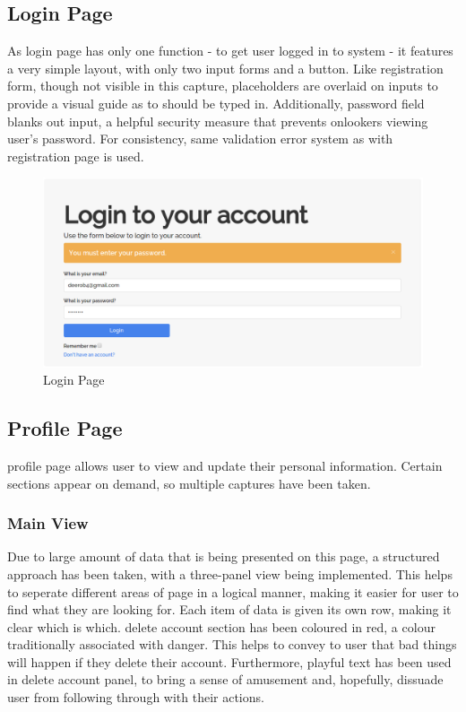 \documentclass{article}[12pt,a4paper]
\begin{document}
\subsection{Login Page}
As login page has only one function - to get user logged in to system - it features a very simple layout, with only two input forms and a button. Like registration form, though not visible in this capture, placeholders are overlaid on inputs to provide a visual guide as to should be typed in. Additionally, password field blanks out input, a helpful security measure that prevents onlookers viewing user's password. For consistency, same validation error system as with registration page is used.

\begin{figure}[h!]
  \includegraphics[scale=0.35]{final_ui/login}
  \caption{Login Page}
\end{figure}
\clearpage

\subsection{Profile Page}
profile page allows user to view and update their personal information. Certain sections appear on demand, so multiple captures have been taken.

\subsubsection{Main View}
Due to large amount of data that is being presented on this page, a structured approach has been taken, with a three-panel view being implemented. This helps to seperate different areas of page in a logical manner, making it easier for user to find what they are looking for. Each item of data is given its own row, making it clear which is which. delete account section has been coloured in red, a colour traditionally associated with danger. This helps to convey to user that bad things will happen if they delete their account. Furthermore, playful text has been used in delete account panel, to bring a sense of amusement and, hopefully, dissuade user from following through with their actions.
\end{document}
